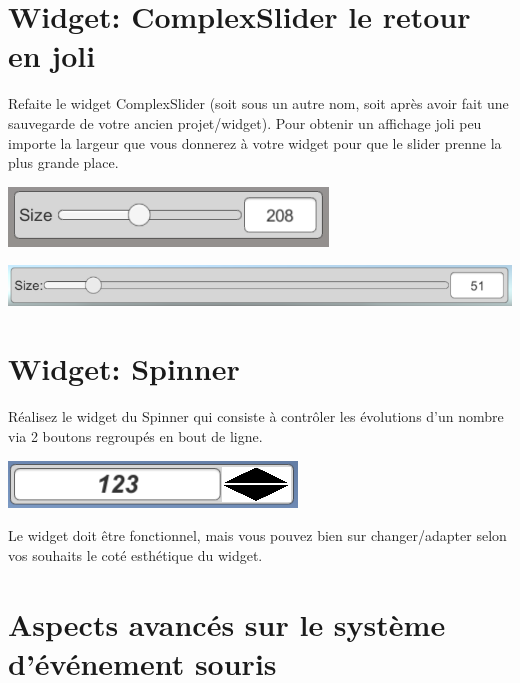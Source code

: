 \documentclass[a4paper,10pt]{article}
\begin{document}
\section{Widget: ComplexSlider le retour en joli}

Refaite le widget ComplexSlider (soit sous un autre nom, soit après avoir fait une sauvegarde de votre ancien projet/widget). Pour obtenir un affichage joli peu importe la largeur que vous donnerez à votre widget pour que le slider prenne la plus grande place.

\begin{center}
	\includegraphics[width=0.6\linewidth]{rc/ui_complexslider_layout}

	\includegraphics[width=0.8\linewidth]{rc/ui_complexslider_layout_v2}
	
\end{center}


\section{Widget: Spinner}

Réalisez le widget du Spinner qui consiste à contrôler les évolutions d'un nombre via 2 boutons regroupés en bout de ligne. 

\begin{center}
	\includegraphics[width=0.6\linewidth]{rc/ui_spinner_layout}
\end{center}

Le widget doit être fonctionnel, mais vous pouvez bien sur changer/adapter selon vos souhaits le coté esthétique du widget.


\section{Aspects avancés sur le système d'événement souris}
\end{document}
